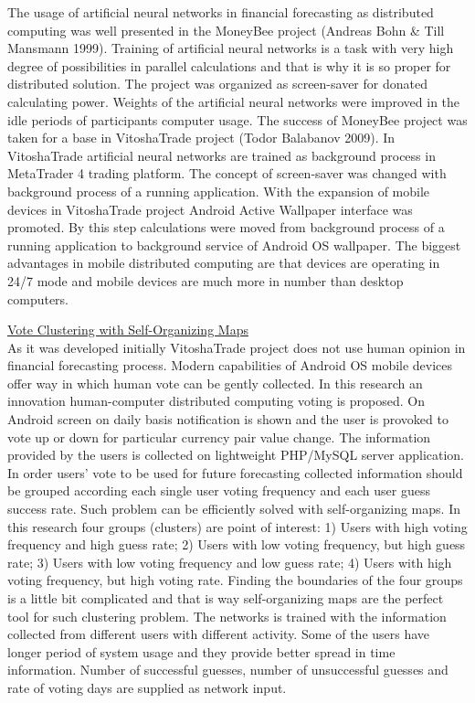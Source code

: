 \documentclass{article}
\begin{document}
The usage of artificial neural networks in financial forecasting as distributed computing was well presented in the MoneyBee project (Andreas Bohn \& Till Mansmann 1999). Training of artificial neural networks is a task with very high degree of possibilities in parallel calculations and that is why it is so proper for distributed solution. The project was organized as screen-saver for donated calculating power. Weights of the artificial neural networks were improved in the idle periods of participants computer usage. The success of MoneyBee project was taken for a base in VitoshaTrade project (Todor Balabanov 2009). In VitoshaTrade artificial neural networks are trained as background process in MetaTrader 4 trading platform. The concept of screen-saver was changed with background process of a running application. With the expansion of mobile devices in VitoshaTrade project Android Active Wallpaper interface was promoted. By this step calculations were moved from background process of a running application to background service of Android OS wallpaper. The biggest advantages in mobile distributed computing are that devices are operating in 24/7 mode and mobile devices are much more in number than desktop computers.

\vspace*{3mm}
\underline{Vote Clustering with Self-Organizing Maps} \\

As it was developed initially VitoshaTrade project does not use human opinion in financial forecasting process. Modern capabilities of Android OS mobile devices offer way in which human vote can be gently collected. In this research an innovation human-computer distributed computing voting is proposed. On Android screen on daily basis notification is shown and the user is provoked to vote up or down for particular currency pair value change. The information provided by the users is collected on lightweight PHP/MySQL server application. \\

In order users' vote to be used for future forecasting collected information should be grouped according each single user voting frequency and each user guess success rate. Such problem can be efficiently solved with self-organizing maps. In this research four groups (clusters) are point of interest: 1) Users with high voting frequency and high guess rate; 2) Users with low voting frequency, but high guess rate; 3) Users with low voting frequency and low guess rate; 4) Users with high voting frequency, but high voting rate. Finding the boundaries of the four groups is a little bit complicated and that is way self-organizing maps are the perfect tool for such clustering problem. The networks is trained with the information collected from different users with different activity. Some of the users have longer period of system usage and they provide better spread in time information. Number of successful guesses, number of unsuccessful guesses and rate of voting days are supplied as network input. \\
\end{document}
